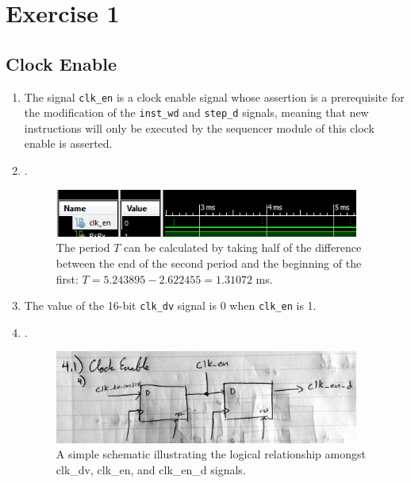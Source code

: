 \documentclass[]{article}
\begin{document}
\section{Exercise 1}


\subsection{Clock Enable}
\begin{enumerate}
\item The signal \texttt{clk\_en} is a clock enable signal whose assertion is a prerequisite for the modification of the \texttt{inst\_wd} and \texttt{step\_d} signals, meaning that new instructions will only be executed by the sequencer module of this clock enable is asserted.
\item . %
\begin{figure}[h]
\centering
\includegraphics[width=10cm]{clk_en.PNG}
\caption{The period $T$ can be calculated by taking half of the difference between the end of the second period and the beginning of the first: $T = 5.243895 - 2.622455 = 1.31072\texttt{}$ ms.}
\end{figure}
\item The value of the 16-bit \texttt{clk\_dv} signal is 0 when \texttt{clk\_en} is 1.
\item . %
\begin{figure}[h]
\centering
\includegraphics[width=10cm]{clk_en.jpg}
\caption{A simple schematic illustrating the logical relationship amongst clk\_dv, clk\_en, and clk\_en\_d signals.}
\end{figure}
\end{enumerate}
\end{document}
